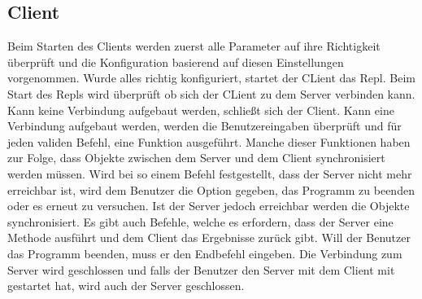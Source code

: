 \documentclass[a4paper,12pt,titlepage]{scrartcl}
\begin{document}
\subsection{Client}
Beim Starten des Clients werden zuerst alle Parameter auf ihre Richtigkeit überprüft und die Konfiguration basierend auf diesen Einstellungen vorgenommen. Wurde alles richtig konfiguriert, startet der CLient das Repl. Beim Start des Repls wird überprüft ob sich der CLient zu dem Server verbinden kann. Kann keine Verbindung aufgebaut werden, schließt sich der Client. Kann eine Verbindung aufgebaut werden, werden die Benutzereingaben überprüft und für jeden validen Befehl, eine Funktion ausgeführt. Manche dieser Funktionen haben zur Folge, dass Objekte zwischen dem Server und dem Client synchronisiert werden müssen. Wird bei so einem Befehl festgestellt, dass der Server nicht mehr erreichbar ist, wird dem Benutzer die Option gegeben, das Programm zu beenden oder es erneut zu versuchen. Ist der Server jedoch erreichbar werden die Objekte synchronisiert. Es gibt auch Befehle, welche es erfordern, dass der Server eine Methode ausführt und dem Client das Ergebnisse zurück gibt. Will der Benutzer das Programm beenden, muss er den Endbefehl eingeben. Die Verbindung zum  Server wird geschlossen und falls der Benutzer den Server mit dem Client mit gestartet hat, wird auch der Server geschlossen.
\end{document}

